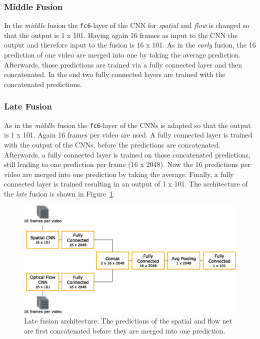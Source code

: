 \subsubsection{Middle Fusion}
In the \emph{middle} fusion the \texttt{fc6}-layer of the CNN for \emph{spatial} and \emph{flow} is changed so that the output is 1 x 101.
Having again 16 frames as input to the CNN the output and therefore input to the fusion is 16 x 101.
As in the \emph{early} fusion, the 16 prediction of one video are merged into one by taking the average prediction.
Afterwards, those predictions are trained via a fully connected layer and then concatenated.
In the end two fully connected layers are trained with the concatenated predictions.

\subsubsection{Late Fusion}
As in the \emph{middle} fusion the \texttt{fc6}-layer of the CNNs is adapted so that the output is 1 x 101.
Again 16 frames per video are used.
A fully connected layer is trained with the output of the CNNs, before the predictions are concatenated.
Afterwards, a fully connected layer is trained on those concatenated predictions, still leading to one prediction per frame (16 x 2048).
Now the 16 predictions per video are merged into one prediction by taking the average.
Finally, a fully connected layer is trained resulting in an output of 1 x 101.
The architecture of the \emph{late} fusion is shown in Figure~\ref{fig:late_fusion}.

\begin{figure}[!htb]
	\centering
	\includegraphics[scale=.7]{images/late_fusion.eps}
	\caption{Late fusion architecture: The predictions of the spatial and flow net are first concatenated before they are merged into one prediction.}
	\label{fig:late_fusion}
\end{figure}

